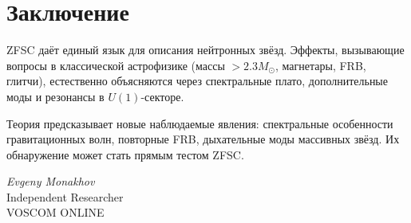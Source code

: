 \documentclass[a4paper,12pt]{article}
\begin{document}
\section*{Заключение}
ZFSC даёт единый язык для описания нейтронных звёзд.  
Эффекты, вызывающие вопросы в классической астрофизике (массы $>2.3M_\odot$, магнетары, FRB, глитчи), естественно объясняются через спектральные плато, дополнительные моды и резонансы в $U(1)$-секторе.  

Теория предсказывает новые наблюдаемые явления: спектральные особенности гравитационных волн, повторные FRB, дыхательные моды массивных звёзд. Их обнаружение может стать прямым тестом ZFSC.

\vspace{2em}
\noindent
\textit{Evgeny Monakhov} \\
Independent Researcher \\
VOSCOM ONLINE
\end{document}
